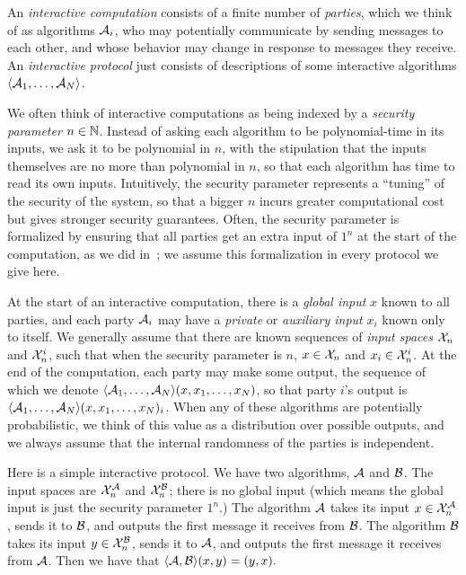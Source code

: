 An \emph{interactive computation} consists of a finite number of \emph{parties},
which we think of as algorithms $\mathcal{A}_i$, who may potentially communicate by
sending messages to each other, and whose behavior may change in response to
messages they receive. An \emph{interactive protocol}
just consists of descriptions of some interactive algorithms $\langle\mathcal{A}_1, \dots,
\mathcal{A}_N\rangle$.

We often think of interactive computations as being indexed by a \emph{security
parameter} $n\in\mathbb{N}$. Instead of asking each algorithm to be polynomial-time in
its inputs, we ask it to be polynomial in $n$, with the stipulation that the
inputs themselves are no more than polynomial in $n$, so that each algorithm has
time to read its own inputs. Intuitively, the security parameter represents a
``tuning'' of the security of the system, so that a bigger $n$ incurs greater
computational cost but gives stronger security guarantees. Often, the security
parameter is formalized by ensuring that all parties get an extra input of $1^n$ at
the start of the computation, as we did in~;
we assume this formalization in every protocol we give here.

At the start of an interactive computation, there is a \emph{global input} $x$
known to all parties, and each party $\mathcal{A}_i$ may have a \emph{private} or
\emph{auxiliary input} $x_i$ known only to itself. We generally assume that
there are known sequences of \emph{input spaces} $\mathcal{X}_n$ and $\mathcal{X}^i_n$, such that
when the security parameter is $n$, $x\in \mathcal{X}_n$ and $x_i\in \mathcal{X}^i_n$. At the end of
the computation, each party may make some output, the sequence of which we
denote $\langle\mathcal{A}_1, \dots, \mathcal{A}_N\rangle(x, x_1, \dots, x_N)$, so that party $i$'s output
is $\langle\mathcal{A}_1, \dots, \mathcal{A}_N\rangle(x, x_1, \dots, x_N)_i$. When any of these algorithms
are potentially probabilistic, we think of this value as a distribution over
possible outputs, and we always assume that the internal randomness of the
parties is independent.

\begin{ex}\label{ex:swap}
  Here is a simple interactive protocol. We have two algorithms, $\mathcal{A}$ and
  $\mathcal{B}$. The input spaces are $\mathcal{X}^{\mathcal{A}}_n$ and $\mathcal{X}^{\mathcal{B}}_n$; there is no global
  input (which means the global input is just the security parameter $1^n$.) The
  algorithm $\mathcal{A}$ takes its input $x\in\mathcal{X}^{\mathcal{A}}_n$, sends it to $\mathcal{B}$, and outputs
  the first message it receives from $\mathcal{B}$. The algorithm $\mathcal{B}$ takes its input
  $y\in\mathcal{X}_n^{\mathcal{B}}$, sends it to $\mathcal{A}$, and outputs the first message it receives
  from $\mathcal{A}$. Then we have that $
    \langle\mathcal{A},\mathcal{B}\rangle(x,y) = (y,x).
  $
\end{ex}

